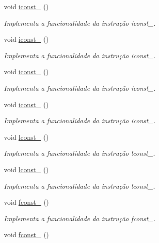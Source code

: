 \begin{DoxyCompactItemize}
void \hyperlink{classOperations_af1a4f99f0d99da0a7db7fc926932a3c8}{iconst\+\_} ()
\begin{DoxyCompactList}\small\item\em Implementa a funcionalidade da instrução iconst\+\_. \end{DoxyCompactList}\item 
void \hyperlink{classOperations_ab8466864c000152e75172b623704f610}{iconst\+\_} ()
\begin{DoxyCompactList}\small\item\em Implementa a funcionalidade da instrução iconst\+\_. \end{DoxyCompactList}\item 
void \hyperlink{classOperations_a5fad2dad3d79c889728a6687f36e1192}{iconst\+\_} ()
\begin{DoxyCompactList}\small\item\em Implementa a funcionalidade da instrução iconst\+\_. \end{DoxyCompactList}\item 
void \hyperlink{classOperations_a87a4c7214825d084ded4a8ea50e4af7c}{iconst\+\_} ()
\begin{DoxyCompactList}\small\item\em Implementa a funcionalidade da instrução iconst\+\_. \end{DoxyCompactList}\item 
void \hyperlink{classOperations_a89586a819a6e67c2168d7d6e43f087ef}{lconst\+\_} ()
\begin{DoxyCompactList}\small\item\em Implementa a funcionalidade da instrução lconst\+\_. \end{DoxyCompactList}\item 
void \hyperlink{classOperations_ae6c6a8e3d75dec712e534434f85909ce}{lconst\+\_} ()
\begin{DoxyCompactList}\small\item\em Implementa a funcionalidade da instrução lconst\+\_. \end{DoxyCompactList}\item 
void \hyperlink{classOperations_ad3d2d82d63e7a96e144cdf014d6fb1d9}{fconst\+\_} ()
\begin{DoxyCompactList}\small\item\em Implementa a funcionalidade da instrução fconst\+\_. \end{DoxyCompactList}\item 
void \hyperlink{classOperations_aa2053d7f3d410a4531f5bd560b4211b4}{fconst\+\_} ()

\end{DoxyCompactItemize}
